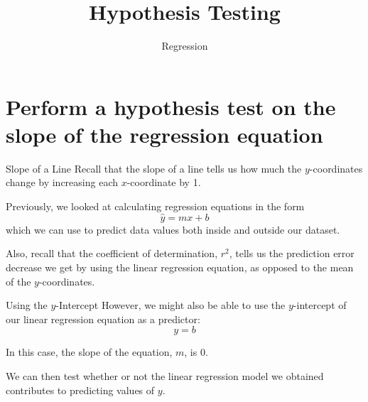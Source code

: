 \documentclass[t]{beamer}
\title{Hypothesis Testing}
\subtitle{Regression}
\author{}
\date{}
\begin{document}

\begin{frame} 
\maketitle
\end{frame}

\section{Perform a hypothesis test on the slope of the regression equation}

\begin{frame}{Slope of a Line}
Recall that the slope of a line tells us how much the $y$-coordinates change by increasing each $x$-coordinate by 1.	\newline\\	\pause

Previously, we looked at calculating regression equations in the form
\[
\hat {y} = mx + b
\]
\newline
which we can use to predict data values both inside and outside our dataset.	\newline\\	\pause

Also, recall that the coefficient of determination, $r^2$, tells us the prediction error decrease we get by using the linear regression equation, as opposed to the mean of the $y$-coordinates.
\end{frame}

\begin{frame}{Using the $y$-Intercept}
However, we might also be able to use the $y$-intercept of our linear regression equation as a predictor:
\[ y = b\]	\pause

In this case, the slope of the equation, $m$, is 0. \newline\\	\pause

We can then test whether or not the linear regression model we obtained contributes to predicting values of $y$.
\end{frame}
\end{document}
